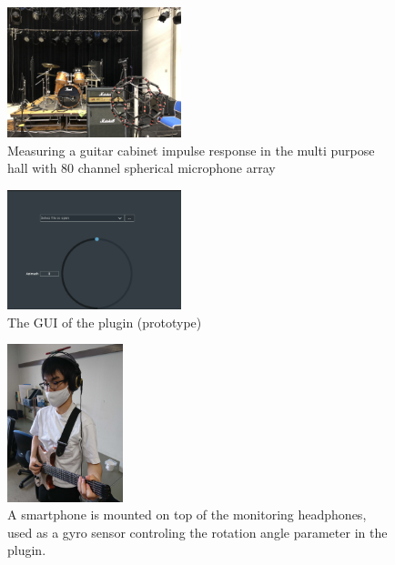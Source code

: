 \documentclass[convention,e-brief]{aesconf-current}
\begin{document}
\begin{figure}
    \centering
    \includegraphics[width=0.45\textwidth]{./fig/fullerene_tajigen.jpg}
    \caption{Measuring a guitar cabinet impulse response in the multi purpose hall with 80 channel spherical microphone array}
    \label{fig:fullerene_tajigen}
\end{figure}

\begin{figure}
    \centering
    \includegraphics[width=0.45\textwidth]{./fig/gui.png}
    \caption{The GUI of the plugin (prototype)}
    \label{fig:gui}
\end{figure}

\begin{figure}
    \centering
    \includegraphics[width=0.3\textwidth]{./fig/headtracker.jpg}
    \caption{A smartphone is mounted on top of the monitoring headphones, used as a gyro sensor controling the rotation angle parameter in the plugin.}
    \label{fig:headtracker}
\end{figure}
\end{document}
